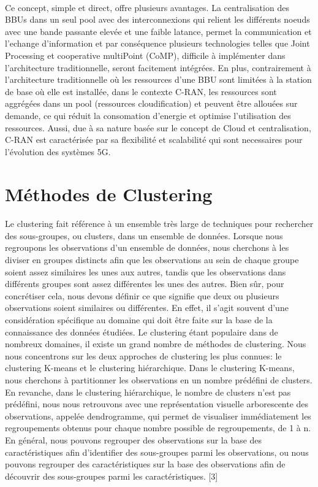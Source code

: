 \documentclass{report}
\begin{document}
\paragraph{}
Ce concept, simple et direct, offre plusieurs avantages. La centralisation des BBUs dans un seul pool avec des interconnexions 
qui relient les différents noeuds avec une bande passante elevée et une faible latance, permet la communication et l'echange d'information et par 
conséquence plusieurs technologies telles que Joint Processing et cooperative multiPoint (CoMP), difficile à implémenter dans l'architecture traditionnelle, seront facitement intégrées. 
En plus, contrairement à l'architecture traditionnelle où les ressources d'une BBU sont limitées à la station de base où elle est installée, dans le contexte C-RAN, 
les ressources sont aggrégées dans un pool (ressources cloudification) et peuvent être allouées sur demande, ce qui réduit la consomation d'energie et optimise l'utilisation des ressources. 
Aussi, due à sa nature basée sur le concept de Cloud et centralisation, C-RAN est caractérisée par sa flexibilité et scalabilité qui sont necessaires pour l'évolution des systèmes 5G.  

\section{Méthodes de Clustering}
\paragraph{}
Le clustering fait référence à un ensemble très large de techniques pour rechercher des sous-groupes, ou clusters, dans un ensemble de données. Lorsque nous regroupons les observations d'un ensemble de données, nous cherchons à les diviser en groupes distincts afin que les observations au sein de chaque groupe soient assez similaires les unes aux autres, tandis que les observations dans différents groupes sont assez différentes les unes des autres. Bien sûr, pour concrétiser cela, nous devons définir ce que signifie que deux ou plusieurs observations soient similaires ou différentes. En effet, il s'agit souvent d'une considération spécifique au domaine qui doit être faite sur la base de la connaissance des données étudiées.
Le clustering étant populaire dans de nombreux domaines, il existe un grand nombre de méthodes de clustering. Nous nous concentrons sur les deux approches de clustering les plus connues: le clustering K-means et le clustering hiérarchique. Dans le clustering K-means, nous cherchons à partitionner les observations en un nombre prédéfini de clusters. En revanche, dans le clustering hiérarchique, le nombre de clusters n'est pas prédéfini, nous nous retrouvons avec une représentation visuelle arborescente des observations, appelée dendrogramme, qui permet de visualiser immédiatement les regroupements obtenus pour chaque nombre possible de regroupements, de 1 à n. 
En général, nous pouvons regrouper des observations sur la base des caractéristiques afin d'identifier des sous-groupes parmi les observations, ou nous pouvons regrouper des caractéristiques sur la base des observations afin de découvrir des sous-groupes parmi les caractéristiques. [3]
\end{document}
